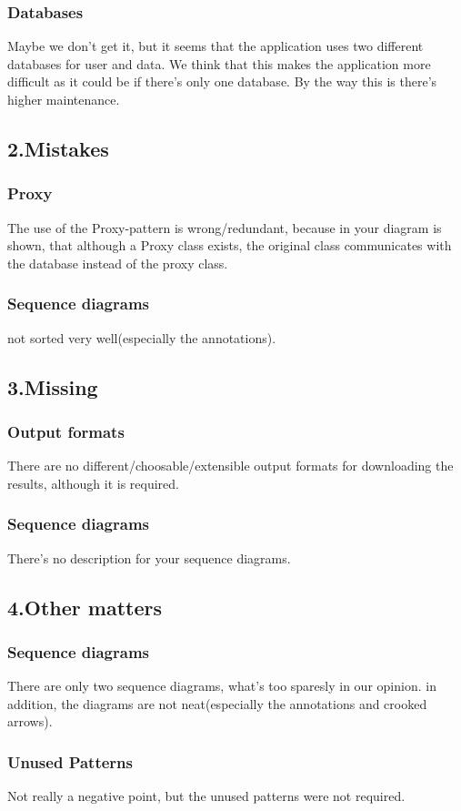 \documentclass{article}
\begin{document}
\subsubsection{Databases}
Maybe we don't get it, but it seems that the application uses two different databases for user and data. We think that this makes the application more difficult as it could be if there's only one database. By the way this is there's higher maintenance.
\subsection{2.Mistakes}
\subsubsection{Proxy}
The use of the Proxy-pattern is wrong/redundant, because in your diagram is shown, that although a Proxy class exists, the original class communicates with the database instead of the proxy class.
\subsubsection{Sequence diagrams}
 not sorted very well(especially the annotations).
\subsection{3.Missing}
\subsubsection{Output formats}
There are no different/choosable/extensible output formats for downloading the results, although it is required.
\subsubsection{Sequence diagrams}
There's no description for your sequence diagrams.
\subsection{4.Other matters}
\subsubsection{Sequence diagrams}
There are only two sequence diagrams, what's too sparesly in our opinion.
in addition, the diagrams are not neat(especially the annotations and crooked arrows).
\subsubsection{Unused Patterns}
Not really a negative point, but the unused patterns were not required.
\end{document}

